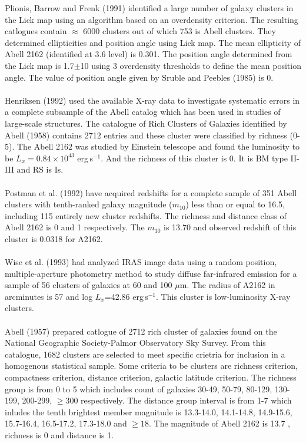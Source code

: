 Plionis, Barrow and Frenk (1991) identified a large number of galaxy clusters in the Lick map using an algorithm based on an overdensity criterion. The resulting catlogues contain $\approx$ 6000 clusters out of which 753 is Abell clusters. They determined ellipticities and position angle using Lick map. The mean ellipticity of Abell 2162 (identified at 3.6 level) is 0.301. The position angle determined from the Lick map is 1.7$\pm$10 using 3 overdensity thresholds to define the mean position angle. The value of position angle given by Sruble and Peebles (1985) is 0.\\\\
Henriksen (1992) used the available X-ray data to investigate systematic errors in a complete subsample of the Abell catalog which has been used in studies of large-scale structures. The catalogue of Rich Clusters of Galaxies identified by Abell (1958) contains 2712 entries and these cluster were classified by richness (0-5). The Abell 2162 was studied by Einstein telescope and found the luminosity to be $L_x=0.84\times 10^{43}$ erg\,s$^{-1}$. And the richness of this cluster is 0. It is BM type II-III and RS is Is.\\\\
Postman et al. (1992) have acquired redshifts for a complete sample of 351 Abell clusters with tenth-ranked galaxy magnitude ($m_{10}$) less than or equal to 16.5, including 115 entirely new cluster redshifts. The richness and distance class of Abell 2162 is 0 and 1 respectively. The $m_{10}$ is 13.70 and observed redshift of this cluster is 0.0318 for A2162.\\\\
Wise et al. (1993) had analyzed IRAS image data using a random position, multiple-aperture photometry method to study diffuse far-infrared emission for a sample of 56 clusters of galaxies at 60 and 100 $\mu$m. The radius of A2162 in arcminutes is 57 and log $L_x$=42.86 erg\,s$^{-1}$. This cluster is low-luminosity X-ray clusters.\\\\
Abell (1957) prepared catlogue of 2712 rich cluster of galaxies found on the National Geographic Society-Palmor Observatory Sky Survey. From this catalogue, 1682 clusters are selected to meet specific crietria for inclusion in a homogenous statistical sample. Some criteria to be clusters are richness criterion, compactness criterion, distance criterion, galactic latitude criterion. The richness group is from 0 to 5 which includes count of galaxies 30-49, 50-79, 80-129, 130-199, 200-299, $\geq 300$ respectively. The distance group interval is from 1-7 which inludes the tenth brightest member magnitude is 13.3-14.0, 14.1-14.8, 14.9-15.6, 15.7-16.4, 16.5-17.2, 17.3-18.0 and $\geq 18$. The magnitude of Abell 2162 is 13.7 , richness is 0 and distance is 1.\\\\
